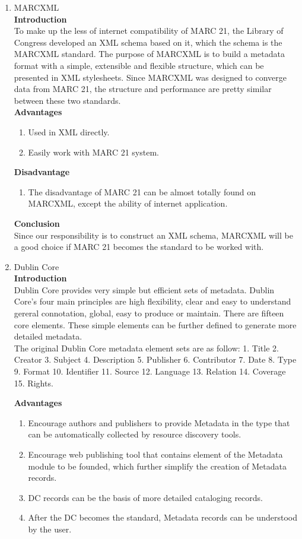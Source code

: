 \begin{enumerate}
	\item MARCXML\\
	{\bf Introduction}\\
	To make up the less of internet compatibility of MARC 21, the Library of Congress developed an XML schema based on it, which the schema is the MARCXML standard. 
	The purpose of MARCXML is to build a metadata format with a simple, extensible and flexible structure, which can be presented in XML stylesheets. 
	Since MARCXML was designed to converge data from MARC 21, the structure and performance are pretty similar between these two standards.\\
	
	{\bf Advantages}
	\begin{enumerate}
		\item Used in XML directly.
		\item Easily work with MARC 21 system.
	\end{enumerate}	
	{\bf Disadvantage}
	\begin{enumerate}
		\item The disadvantage of MARC 21 can be almost totally found on MARCXML, except the ability of internet application.
	\end{enumerate}
	{\bf Conclusion}\\
	Since our responsibility is to construct an XML schema, MARCXML will be a good choice if MARC 21 becomes the standard to be worked with.
	
	\item Dublin Core\\
	{\bf Introduction}\\
	Dublin Core provides very simple but efficient sets of metadata.
	Dublin Core’s four main principles are high flexibility, clear and easy to understand gereral connotation, global, easy to produce or maintain.
	There are fifteen core elements. These simple elements can be further defined to generate more detailed metadata.\\
	The original Dublin Core metadata element sets are as follow:
	1. Title 2. Creator 3. Subject 4. Description 5. Publisher 
	6. Contributor 7. Date 8. Type 9. Format 10. Identifier
	11. Source 12. Language 13. Relation 14. Coverage 15. Rights.
	\cite{NISO2012}
	
	{\bf Advantages}
	\begin{enumerate}
		\item Encourage authors and publishers to provide Metadata in the type that can be automatically collected by resource discovery tools.
		\item Encourage web publishing tool that contains element of the Metadata module to be founded, which further simplify the creation of Metadata records.
		\item DC records can be the basis of more detailed cataloging records.
		\item After the DC becomes the standard, Metadata records can be understood by the user.
	\end{enumerate}	
		

\end{enumerate}
